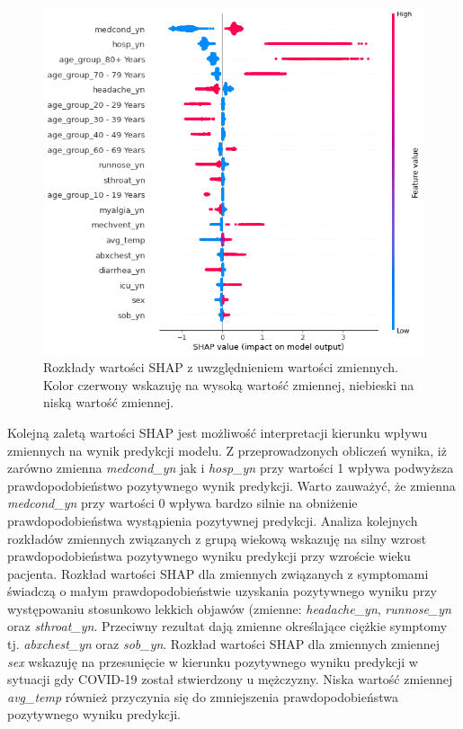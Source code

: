 \documentclass[polish, twoside, 12pt, a4paper]{article}
\theoremstyle{definition}
\theoremstyle{plain}
\theoremstyle{remark}
\begin{document}
\begin{figure}[H]
\centering
\includegraphics[width=15cm]{shap_summary.png}
\caption{Rozkłady wartości SHAP z uwzględnieniem wartości zmiennych. Kolor czerwony wskazuję na wysoką wartość zmiennej, niebieski na niską wartość zmiennej.}
\end{figure}

Kolejną zaletą wartości SHAP jest możliwość interpretacji kierunku wpływu zmiennych na wynik predykcji modelu. Z przeprowadzonych obliczeń wynika, iż zarówno zmienna \emph{medcond\_yn} jak i \emph{hosp\_yn} przy wartości 1 wpływa podwyższa prawdopodobieństwo pozytywnego wynik predykcji. Warto zauważyć, że zmienna \emph{medcond\_yn} przy wartości 0 wpływa bardzo silnie na obniżenie prawdopodobieństwa wystąpienia pozytywnej predykcji. Analiza kolejnych rozkładów zmiennych związanych z grupą wiekową wskazuję na silny wzrost prawdopodobieństwa pozytywnego wyniku predykcji przy wzroście wieku pacjenta. Rozkład wartości SHAP dla zmiennych związanych z symptomami świadczą o małym prawdopodobieństwie uzyskania pozytywnego wyniku przy występowaniu stosunkowo lekkich objawów (zmienne: \emph{headache\_yn}, \emph{runnose\_yn} oraz \emph{sthroat\_yn}. Przeciwny rezultat dają zmienne określające ciężkie symptomy tj. \emph{abxchest\_yn} oraz \emph{sob\_yn}. Rozkład wartości SHAP dla zmiennych zmiennej \emph{sex} wskazuję na przesunięcie w kierunku pozytywnego wyniku predykcji w sytuacji gdy COVID-19 został stwierdzony u mężczyzny. Niska wartość zmiennej \emph{avg\_temp} również przyczynia się do zmniejszenia prawdopodobieństwa pozytywnego wyniku predykcji. 
\end{document}

